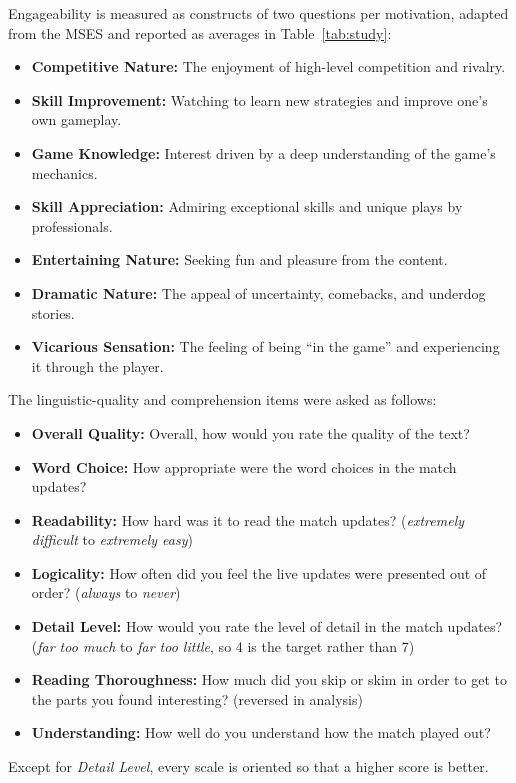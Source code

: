 \documentclass[11pt]{article}
\begin{document}
Engageability is measured as constructs of two questions per motivation, adapted from the MSES \citep{qian2020} and reported as averages in Table~\ref{tab:study}:
\begin{itemize}[noitemsep,topsep=2pt,leftmargin=*]
  \item \textbf{Competitive Nature:} The enjoyment of high-level competition and rivalry.
  \item \textbf{Skill Improvement:} Watching to learn new strategies and improve one's own gameplay.
  \item \textbf{Game Knowledge:} Interest driven by a deep understanding of the game's mechanics.
  \item \textbf{Skill Appreciation:} Admiring exceptional skills and unique plays by professionals.
  \item \textbf{Entertaining Nature:} Seeking fun and pleasure from the content.
  \item \textbf{Dramatic Nature:} The appeal of uncertainty, comebacks, and underdog stories.
  \item \textbf{Vicarious Sensation:} The feeling of being ``in the game'' and experiencing it through the player.
\end{itemize}

The linguistic-quality \citep{callaway2002} and comprehension items were asked as follows:
\begin{itemize}[noitemsep,topsep=2pt,leftmargin=*]
  \item \textbf{Overall Quality:} Overall, how would you rate the quality of the text?
  \item \textbf{Word Choice:} How appropriate were the word choices in the match updates?
  \item \textbf{Readability:} How hard was it to read the match updates? (\emph{extremely difficult} to \emph{extremely easy})
  \item \textbf{Logicality:} How often did you feel the live updates were presented out of order? (\emph{always} to \emph{never})
  \item \textbf{Detail Level:} How would you rate the level of detail in the match updates? (\emph{far too much} to \emph{far too little}, so 4 is the target rather than 7)
  \item \textbf{Reading Thoroughness:} How much did you skip or skim in order to get to the parts you found interesting? (reversed in analysis)
  \item \textbf{Understanding:} How well do you understand how the match played out?
\end{itemize}
Except for \emph{Detail Level}, every scale is oriented so that a higher score is better.
\end{document}

